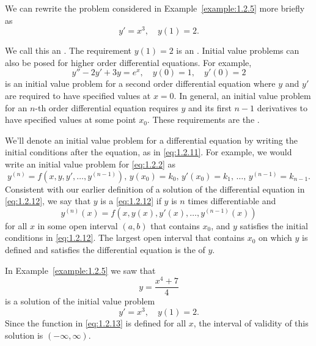 \documentclass{ximera}
\begin{document}
 We can rewrite the problem considered in Example~\ref{example:1.2.5}
more briefly as
$$
y'=x^3,\quad y(1)=2.
$$
 
 We call this an .
The requirement $y(1)=2$ is an .
 Initial value problems can also be
posed for higher order differential equations.  For example,
\begin{equation} \label{eq:1.2.11}
y'' - 2y'+3y=e^x, \quad y(0)=1, \quad y'(0)=2
\end{equation}
is  an initial value problem for a second order differential
equation where $y$ and $y'$ are required to have specified values at
 $x=0$. In general, an initial value
problem for an $n$-th order differential equation requires $y$ and its
first $n-1$ derivatives to have specified values at some point $x_0$.
These requirements are the .
 
We'll denote an initial value problem for a differential equation by
writing the initial conditions after the equation, as in
\eqref{eq:1.2.11}. For example, we would write an initial value problem
for \eqref{eq:1.2.2} as
\begin{equation} \label{eq:1.2.12}
y^{(n)}=f(x,y,y', \dots,y^{(n-1)}),\, y(x_0)=k_0,\,
y'(x_0)=k_1,\, \dots,\, y^{(n-1)}=k_{n-1}.
\end{equation}
Consistent with our earlier definition of a solution of the
differential equation in \eqref{eq:1.2.12}, we say that $y$ is a  \eqref{eq:1.2.12}  if $y$ is $n$ times
differentiable and
$$
y^{(n)}(x)=f(x,y(x),y'(x), \dots,y^{(n-1)}(x))
$$
for all $x$ in some open interval $(a,b)$  that contains $x_0$,
and  $y$ satisfies the initial conditions in \eqref{eq:1.2.12}. The
largest open interval that contains $x_0$ on which $y$ is defined and
satisfies the differential equation is  the  of $y$.
 
\begin{example}\label{example:1.2.6}
In Example~\ref{example:1.2.5} we saw that
\begin{equation} \label{eq:1.2.13}
y=\frac{x^4+7}{4}
\end{equation}
is a solution of the initial value problem
$$
y'=x^3,\quad y(1)=2.
$$
Since the function in \eqref{eq:1.2.13} is defined for all $x$, the
interval of validity of this solution is $(-\infty,\infty)$.
\end{example}
 
\end{document}
